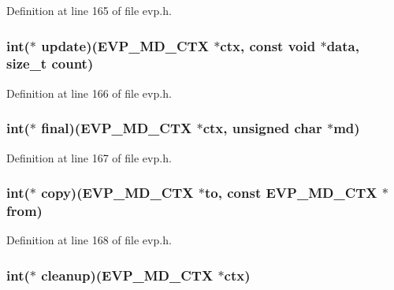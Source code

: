 Definition at line 165 of file evp.\+h.

\subsubsection[{\texorpdfstring{update}{update}}]{\setlength{\rightskip}{0pt plus 5cm}int($\ast$ update)({\bf E\+V\+P\+\_\+\+M\+D\+\_\+\+C\+TX} $\ast$ctx, const {\bf void} $\ast$data, size\+\_\+t count)}\hypertarget{structenv__md__st_a72478f17745f90449c81abc3cacd1eef}{}\label{structenv__md__st_a72478f17745f90449c81abc3cacd1eef}


Definition at line 166 of file evp.\+h.

\subsubsection[{\texorpdfstring{final}{final}}]{\setlength{\rightskip}{0pt plus 5cm}int($\ast$ final)({\bf E\+V\+P\+\_\+\+M\+D\+\_\+\+C\+TX} $\ast$ctx, unsigned char $\ast$md)}\hypertarget{structenv__md__st_ad2de4dcf71454b848a0d2c921f6ec09d}{}\label{structenv__md__st_ad2de4dcf71454b848a0d2c921f6ec09d}


Definition at line 167 of file evp.\+h.

\subsubsection[{\texorpdfstring{copy}{copy}}]{\setlength{\rightskip}{0pt plus 5cm}int($\ast$ copy)({\bf E\+V\+P\+\_\+\+M\+D\+\_\+\+C\+TX} $\ast$to, const {\bf E\+V\+P\+\_\+\+M\+D\+\_\+\+C\+TX} $\ast$from)}\hypertarget{structenv__md__st_aca4867d63898ec8b6e73089bec954d9c}{}\label{structenv__md__st_aca4867d63898ec8b6e73089bec954d9c}


Definition at line 168 of file evp.\+h.

\subsubsection[{\texorpdfstring{cleanup}{cleanup}}]{\setlength{\rightskip}{0pt plus 5cm}int($\ast$ cleanup)({\bf E\+V\+P\+\_\+\+M\+D\+\_\+\+C\+TX} $\ast$ctx)}\hypertarget{structenv__md__st_aabdc7487a89117b983e1be68d91e9632}{}\label{structenv__md__st_aabdc7487a89117b983e1be68d91e9632}



